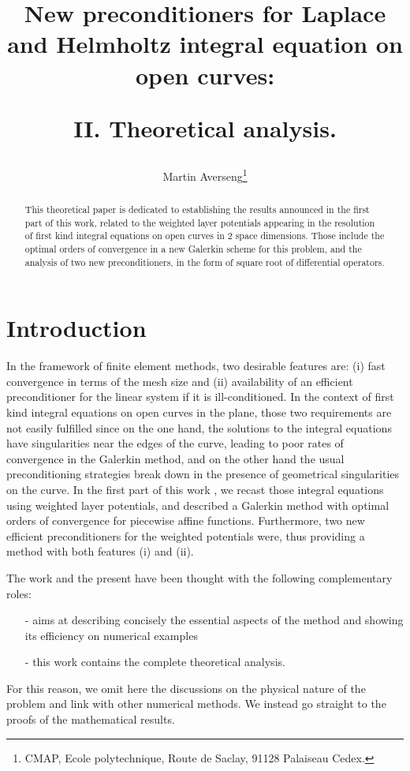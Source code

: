 \documentclass[a4paper]{article}
\title{New preconditioners for Laplace and  Helmholtz integral equation on open curves: \\ \vspace{0.5cm}
	\begin{Large} 
		II. Theoretical analysis.
	\end{Large} }
\author{Martin Averseng\footnote{CMAP, Ecole polytechnique, Route de Saclay, 91128 Palaiseau Cedex.}}
\begin{document}
\maketitle

\begin{abstract}
	This theoretical paper is dedicated to establishing the results announced in the first part of this work, related to the weighted layer potentials appearing in the resolution of first kind integral equations on open curves in 2 space dimensions. Those include the optimal orders of convergence in a new Galerkin scheme for this problem, and the analysis of two new preconditioners, in the form of square root of differential operators.
\end{abstract}

\section*{Introduction}


In the framework of finite element methods, two desirable features are: (i) fast convergence in terms of the mesh size and (ii) availability of an efficient preconditioner for the linear system if it is ill-conditioned. In the context of first kind integral equations on open curves in the plane, those two requirements are not easily fulfilled since on the one hand, the solutions to the integral equations have singularities near the edges of the curve, leading to poor rates of convergence in the Galerkin method, and on the other hand the usual preconditioning strategies break down in the presence of geometrical singularities on the curve. In the first part of this work \cite{alouges2018new}, we recast those integral equations using weighted layer potentials, and described a Galerkin method with optimal orders of convergence for piecewise affine functions. Furthermore, two new efficient preconditioners for the weighted potentials were, thus providing a method with both features (i) and (ii). 

The work \cite{alouges2018new} and the present have been thought with the following complementary roles: 
\begin{itemize}
	\item[-] \cite{alouges2018new} aims at describing concisely the essential aspects of the method and showing its efficiency on numerical examples
	\item[-] this work contains the complete theoretical analysis.
\end{itemize}
For this reason, we omit here the discussions on the physical nature of the problem and link with other numerical methods. We instead go straight to the proofs of the mathematical results. 
\end{document}
